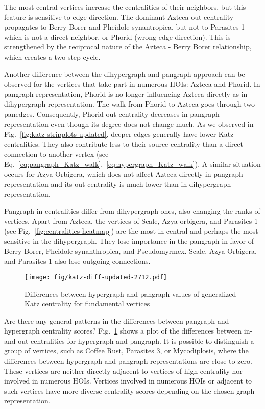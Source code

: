 \documentclass[a4paper,12pt]{article}
\theoremstyle{definition}
\theoremstyle{remark}
\begin{document}
The most central vertices increase the centralities of their neighbors, but this feature is sensitive to edge direction. The dominant Azteca out-centrality propagates to Berry Borer and Pheidole synantropica, but not to Parasites 1 which is not a direct neighbor, or Phorid (wrong edge direction). This is strengthened by the reciprocal nature of the Azteca - Berry Borer relationship, which creates a two-step cycle.

Another difference between the dihypergraph and pangraph approach can be observed for the vertices that take part in numerous HOIs: Azteca and Phorid. In pangraph representation, Phorid is no longer influencing Azteca directly as in dihypergraph representation. The walk from Phorid to Azteca goes through two panedges. Consequently, Phorid out-centrality decreases in pangraph representation even though its degree does not change much. As we observed in Fig.~\ref{fig:katz-stripplots-updated}, deeper edges generally have lower Katz centralities. They also contribute less to their source centrality than a direct connection to another vertex (see Eq.~\ref{eq:pangraph_Katz_walk},~\ref{eq:hypergraph_Katz_walk}). A similar situation occurs for Azya Orbigera, which does not affect Azteca directly in pangraph representation and its out-centrality is much lower than in dihypergraph representation.


Pangraph in-centralities differ from dihypergraph ones, also changing the ranks of vertices. Apart from Azteca, the vertices of Scale, Azya orbigera, and Parasites 1 (see Fig.~\ref{fig:centralities-heatmap}) are the most in-central and perhaps the most sensitive in the dihypergraph. They lose importance in the pangraph in favor of Berry Borer, Pheidole synanthropica, and Pseudomyrmex. Scale, Azya Orbigera, and Parasites 1 also lose outgoing connections.

\begin{figure}[ht]
    \centering\texttt{[image: fig/katz-diff-updated-2712.pdf]}
    \caption{Differences between hypergraph and pangraph values of generalized Katz centrality for fundamental vertices}
    \label{fig:katz-diff-updated}
\end{figure}

Are there any general patterns in the differences between pangraph and hypergraph centrality scores? Fig.~\ref{fig:katz-diff-updated} shows a plot of the differences between in- and out-centralities for hypergraph and pangraph. It is possible to distinguish a group of vertices, such as Coffee Rust, Parasites 3, or Mycodiplosis, where the differences between hypergraph and pangraph representations are close to zero. These vertices are neither directly adjacent to vertices of high centrality nor involved in numerous HOIs. Vertices involved in numerous HOIs or adjacent to such vertices have more diverse centrality scores depending on the chosen graph representation.  
\end{document}
